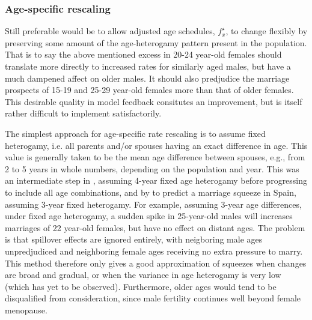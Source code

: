 \subsubsection{Age-specific rescaling}
Still preferable would be to allow adjusted age schedules, $f_x^{\star}$, to change flexibly by preserving some amount of the age-heterogamy pattern present in the population. That is to say the above mentioned excess in 20-24 year-old females should translate more directly to increased rates for similarly aged males, but have a much dampened affect on older males. It should also predjudice the marriage prospects of 15-19 and 25-29 year-old females more than that of older females. This desirable quality in model feedback consitutes an improvement, but is itself rather difficult to implement satisfactorily. 

The simplest approach for age-specific rate rescaling is to assume fixed heterogamy, i.e. all parents and/or spouses having an exact difference in age. This value is generally taken to be the mean age difference between spouses, e.g., from 2 to 5 years in whole numbers, depending on the population and year. This was an intermediate step in \citet{karmel1947relations}, assuming 4-year fixed age heterogamy before progressing to include all age combinations, and by \citet{cabre1997tortulos} to predict a marriage squeeze in Spain, assuming 3-year fixed heterogamy. For example, assuming 3-year age differences, under fixed age heterogamy, a sudden spike in 25-year-old males will increases marriages of 22 year-old females, but have no effect on distant ages. The problem is that spillover effects are ignored entirely, with neigboring male ages unpredjudiced and neighboring female ages receiving no extra pressure to marry. This method therefore only gives a good approximation of squeezes when changes are broad and gradual, or when the variance in age heterogamy is very low (which has yet to be observed). Furthermore, older ages would tend to be disqualified from consideration, since male fertility continues well beyond female menopause.

